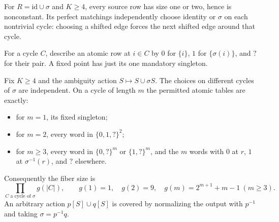 For $R=\mathrm{id}\cup\sigma$ and $K\geq4$, every source row has size
one or two, hence is nonconstant. Its perfect matchings independently
choose identity or $\sigma$ on each nontrivial cycle: choosing a shifted
edge forces the next shifted edge around that cycle.

For a cycle $C$, describe an atomic row at $i\in C$ by
$0$ for $\{i\}$, $1$ for $\{\sigma(i)\}$, and $?$ for their pair.
A fixed point has just its one mandatory singleton.

\begin{theorem}\label{gen:thm:cycles}
Fix $K\geq4$ and the ambiguity action $S\mapsto S\cup\sigma S$.
The choices on different cycles of $\sigma$ are independent.
On a cycle of length $m$ the permitted atomic tables are exactly:
\begin{itemize}
\item for $m=1$, its fixed singleton;
\item for $m=2$, every word in $\{0,1,?\}^2$;
\item for $m\geq3$, every word in $\{0,?\}^m$ or $\{1,?\}^m$,
and the $m$ words with $0$ at $r$, $1$ at $\sigma^{-1}(r)$,
and $?$ elsewhere.
\end{itemize}
Consequently the fiber size is
\[
 \prod_{C\text{ a cycle of }\sigma}g(|C|),\qquad
 g(1)=1,\quad g(2)=9,\quad g(m)=2^{m+1}+m-1\ (m\geq3).
\]
An arbitrary action $p[S]\cup q[S]$ is covered by normalizing the output
with $p^{-1}$ and taking $\sigma=p^{-1}q$.
\end{theorem}
